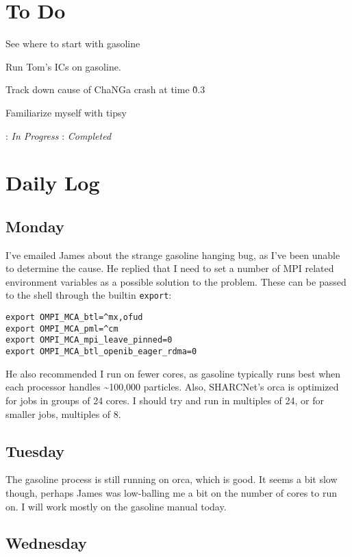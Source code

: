 \documentclass[11pt,letterpaper]{article}
\begin{document}
\section{To Do}
\begin{bullets}
\item[\checkmark] See where to start with gasoline
\item[\textleaf] Run Tom's ICs on gasoline.
\item Track down cause of ChaNGa crash at time \~0.3
\item Familiarize myself with tipsy
\end{bullets}

\textleaf : \textit{In Progress} \qquad \checkmark : \textit{Completed}
\section{Daily Log}

\subsection{Monday}

I've emailed James about the strange gasoline hanging bug, as I've been
unable to determine the cause. He replied that I need to set a number of
MPI related environment variables as a possible solution to the problem.
These can be passed to the shell through the builtin \verb!export!:

\begin{verbatim}
export OMPI_MCA_btl=^mx,ofud
export OMPI_MCA_pml=^cm
export OMPI_MCA_mpi_leave_pinned=0
export OMPI_MCA_btl_openib_eager_rdma=0
\end{verbatim}

He also recommended I run on fewer cores, as gasoline typically runs
best when each processor handles \textasciitilde{}100,000 particles.
Also, SHARCNet's orca is optimized for jobs in groups of 24 cores. I
should try and run in multiples of 24, or for smaller jobs, multiples of
8.

\subsection{Tuesday}

The gasoline process is still running on orca, which is good. It seems a
bit slow though, perhaps James was low-balling me a bit on the number of
cores to run on. I will work mostly on the gasoline manual today.

\subsection*{Wednesday}
\end{document}
